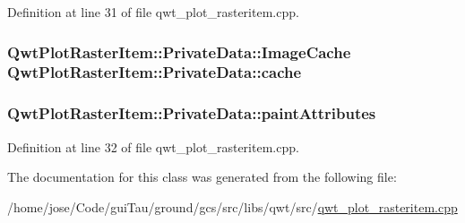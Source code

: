 Definition at line 31 of file qwt\-\_\-plot\-\_\-rasteritem.\-cpp.

\hypertarget{class_qwt_plot_raster_item_1_1_private_data_a146a44edc4df26a88b9c251fe0770a69}{
\subsubsection[{cache}]{ {\bf Qwt\-Plot\-Raster\-Item\-::\-Private\-Data\-::\-Image\-Cache}  Qwt\-Plot\-Raster\-Item\-::\-Private\-Data\-::cache}}\label{class_qwt_plot_raster_item_1_1_private_data_a146a44edc4df26a88b9c251fe0770a69}
\hypertarget{class_qwt_plot_raster_item_1_1_private_data_a4833c1b42120a1530a7acc0e9bb4cd5c}{
\subsubsection[{paint\-Attributes}]{ Qwt\-Plot\-Raster\-Item\-::\-Private\-Data\-::paint\-Attributes}}\label{class_qwt_plot_raster_item_1_1_private_data_a4833c1b42120a1530a7acc0e9bb4cd5c}


Definition at line 32 of file qwt\-\_\-plot\-\_\-rasteritem.\-cpp.



The documentation for this class was generated from the following file\-:\begin{DoxyCompactItemize}
\item 
/home/jose/\-Code/gui\-Tau/ground/gcs/src/libs/qwt/src/\hyperlink{qwt__plot__rasteritem_8cpp}{qwt\-\_\-plot\-\_\-rasteritem.\-cpp}\end{DoxyCompactItemize}
